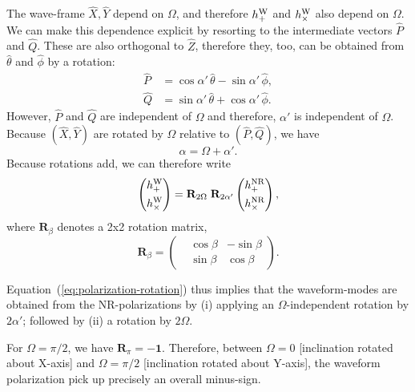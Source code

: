 \documentclass[aps,prd,amssymb,amsmath,amsfonts,superscriptaddress,
floatfix ,preprintnumbers,altaffilletter]{revtex4}
\newcommand{\EtNR}{{\hat\theta}}
\newcommand{\EpNR}{{\hat\phi}}
\newcommand{\hpNR}{h_+^{\rm NR}}
\newcommand{\hcNR}{h_{\times}^{\rm NR}}
\newcommand{\ExW}{\hat X}
\newcommand{\EyW}{\hat Y}
\newcommand{\EzW}{\hat Z}
\newcommand{\hpW}{h_+^{\rm W}}
\newcommand{\hcW}{h_\times^{\rm W}}
\begin{document}
The wave-frame $\ExW, \EyW$ depend on $\Omega$, and therefore $\hpW$
and $\hcW$ also depend on $\Omega$.  We can make this dependence
explicit by resorting to the intermediate vectors $\hat P$ and
$\hat Q$.  These are also orthogonal to $\EzW$, therefore they, too,
can be obtained from $\EtNR$ and $\EpNR$ by a rotation:
\begin{subequations}
\begin{align}
\hat P & = \cos\alpha'\,\EtNR - \sin\alpha'\,\EpNR,\\
\hat Q & = \sin\alpha'\,\EtNR + \cos\alpha'\,\EpNR.
\end{align}
\end{subequations}
However, $\hat P$ and $\hat Q$ are independent of $\Omega$ and
therefore, $\alpha'$ is independent of $\Omega$.  Because
$(\ExW, \EyW)$ are rotated by $\Omega$ relative to $(\hat P, \hat Q)$,
we have
\begin{equation}
\alpha = \Omega+\alpha'.
\end{equation}
Because rotations add, we can therefore write
\begin{equation}\label{eq:polarization-rotation}
\left(\begin{aligned}\hpW\\\hcW \end{aligned}\right)
= {\mathbf R}_{2\Omega}\; {\mathbf R}_{2\alpha'} 
\left(\begin{aligned}\hpNR\\\hcNR \end{aligned}\right),
\end{equation}
where ${\mathbf R}_\beta$ denotes a 2x2 rotation matrix,
\begin{equation}
{\mathbf R}_\beta = \left(\begin{aligned}&\cos\beta & -\sin\beta \\ & \sin\beta & \cos\beta\end{aligned}\right).
\end{equation}

Equation~(\ref{eq:polarization-rotation}) thus implies that the
waveform-modes are obtained from the NR-polarizations by (i) applying
an $\Omega$-independent rotation by $2\alpha'$; followed by (ii) a
rotation by $2\Omega$.

For $\Omega=\pi/2$, we have ${\mathbf R}_\pi = -{\mathbf 1}$.
Therefore, between $\Omega=0$ [inclination rotated about X-axis] and
$\Omega=\pi/2$ [inclination rotated about Y-axis], the waveform
polarization pick up precisely an overall minus-sign. 
\end{document}
